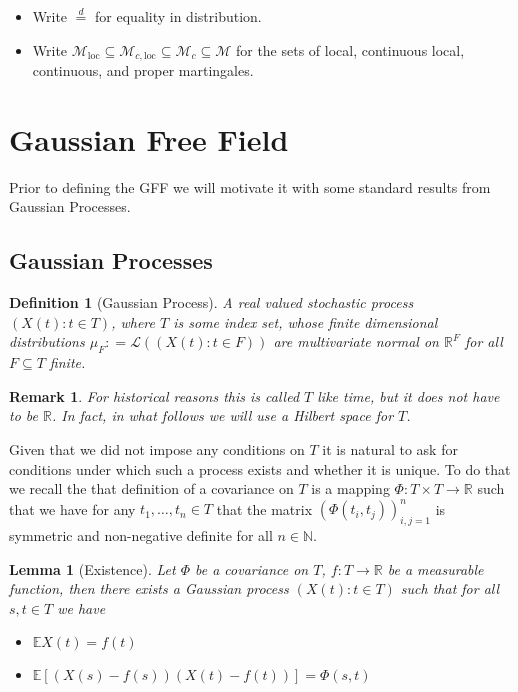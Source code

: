 \documentclass[11pt,reqno]{amsart}
\numberwithin{equation}{section}
\newtheorem{lem}[thm]{Lemma}
\newtheorem{defi}[thm]{Definition}
\newtheorem{rem}[thm]{Remark}
\newcommand{\eqby}[1]{\mathrel{\stackrel{#1}{=}}}
\newcommand{\deq}{\mathrel{\mathop:}=}
\begin{document}
\begin{itemize}
	\item Write $\eqby{d}$ for equality in distribution.
	\item Write $\mathcal M_\text{loc}\subseteq\mathcal M_{c,\text{loc}}\subseteq\mathcal M_c\subseteq\mathcal M$ for the sets of local, continuous local, continuous, and proper martingales.
\end{itemize}

\section{Gaussian Free Field}

Prior to defining the GFF we will motivate it with some standard results from Gaussian Processes.

\subsection{Gaussian Processes}

\begin{defi}[Gaussian Process]
	A real valued stochastic process $(X(t):t\in T)$, where $T$ is some index set, whose finite dimensional distributions $\mu_F\deq \mathcal L((X(t):t\in F))$ are multivariate normal on $\mathbb R^F$ for all $F\subseteq T$ finite.
\end{defi}

\begin{rem}
	For historical reasons this is called $T$ like time, but it does not have to be $\mathbb R$. In fact, in what follows we will use a Hilbert space for $T$.
\end{rem}

Given that we did not impose any conditions on $T$ it is natural to ask for conditions under which such a process exists and whether it is unique. To do that we recall the that definition of a covariance on $T$ is a mapping $\Phi:T\times T\rightarrow\mathbb R$ such that we have for any $t_1,\dots, t_n\in T$ that the matrix $(\Phi(t_i,t_j))_{i,j=1}^n$ is symmetric and non-negative definite for all $n\in\mathbb N$.

\begin{lem}[Existence]\label{lem:existenceofGPgivenCov}
	Let $\Phi$ be a covariance on $T$, $f:T\rightarrow\mathbb R$ be a measurable function, then there exists a Gaussian process $(X(t):t\in T)$ such that for all $s,t\in T$ we have
	\begin{itemize}
		\item $\mathbb E X(t) = f(t)$
		\item $\mathbb E[(X(s)-f(s))(X(t)-f(t))]=\Phi(s,t)$
	\end{itemize}
\end{lem}
\end{document}
